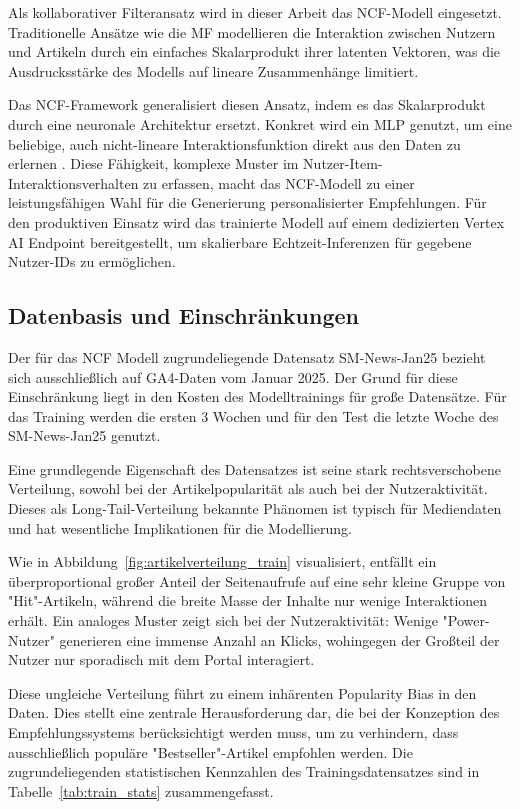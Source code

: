 Als kollaborativer Filteransatz wird in dieser Arbeit das \ac{NCF}-Modell eingesetzt. 
Traditionelle Ansätze wie die \ac{MF} modellieren die Interaktion zwischen Nutzern und Artikeln durch ein einfaches Skalarprodukt ihrer latenten Vektoren,
was die Ausdrucksstärke des Modells auf lineare Zusammenhänge limitiert.

Das NCF-Framework generalisiert diesen Ansatz, indem es das Skalarprodukt durch eine neuronale Architektur ersetzt. 
Konkret wird ein \ac{MLP} genutzt, um eine beliebige, auch nicht-lineare Interaktionsfunktion direkt aus den Daten zu erlernen \cite{he_neural_2017}. 
Diese Fähigkeit, komplexe Muster im Nutzer-Item-Interaktionsverhalten zu erfassen, macht das NCF-Modell zu einer 
leistungsfähigen Wahl für die Generierung personalisierter Empfehlungen.
Für den produktiven Einsatz wird das trainierte Modell auf einem dedizierten Vertex AI Endpoint bereitgestellt, 
um skalierbare Echtzeit-Inferenzen für gegebene Nutzer-IDs zu ermöglichen.


\subsection{Datenbasis und Einschränkungen}
\label{sec:data}
Der für das \ac{NCF} Modell zugrundeliegende Datensatz SM-News-Jan25 bezieht sich ausschließlich auf \ac{GA4}-Daten vom Januar 2025.
Der Grund für diese Einschränkung liegt in den Kosten des Modelltrainings für große Datensätze. Für das Training werden die ersten 3 Wochen 
und für den Test die letzte Woche des SM-News-Jan25 genutzt. 

Eine grundlegende Eigenschaft des Datensatzes ist seine stark rechtsverschobene Verteilung, 
sowohl bei der Artikelpopularität als auch bei der Nutzeraktivität. Dieses als Long-Tail-Verteilung 
bekannte Phänomen ist typisch für Mediendaten und hat wesentliche Implikationen für die Modellierung.


\label{fig:artikelverteilung_train}

Wie in Abbildung~\ref{fig:artikelverteilung_train} visualisiert, entfällt ein überproportional großer Anteil der Seitenaufrufe auf eine sehr 
kleine Gruppe von "Hit"-Artikeln, während die breite Masse der Inhalte nur wenige Interaktionen erhält. 
Ein analoges Muster zeigt sich bei der Nutzeraktivität: Wenige "Power-Nutzer" generieren eine immense Anzahl an Klicks, 
wohingegen der Großteil der Nutzer nur sporadisch mit dem Portal interagiert.

Diese ungleiche Verteilung führt zu einem inhärenten Popularity Bias in den Daten. 
Dies stellt eine zentrale Herausforderung dar, die bei der Konzeption des Empfehlungssystems berücksichtigt werden muss, um zu verhindern, 
dass ausschließlich populäre "Bestseller"-Artikel empfohlen werden. 
Die zugrundeliegenden statistischen Kennzahlen des Trainingsdatensatzes sind in Tabelle~\ref{tab:train_stats} zusammengefasst.


\label{tab:train_stats}

